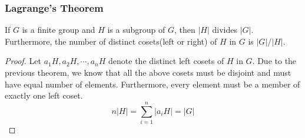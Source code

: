 \documentclass{beamer}
\begin{document}
	\begin{frame}
		\frametitle{Lagrange's Theorem}
		\begin{theorem}[Lagrange, 1770]
			If $G$ is a finite group and $H$ is a subgroup of $G$, then $|H|$ divides $|G|$. Furthermore, the number of distinct cosets(left or right) of $H$ in $G$ is $|G|/|H|$.
		\end{theorem}
		\begin{proof}
			Let $a_1H,a_2H,\cdots,a_nH$ denote the distinct left cosets of $H$ in $G$. Due to the previous theorem, we know that all the above cosets must be disjoint and must have equal number of elements. Furthermore, every element must be a member of exactly one left coset. 
			\begin{equation*}
				n|H| = \sum_{i=1}^n|a_iH| = |G|
			\end{equation*}
		\end{proof}
	\end{frame}
	
\end{document}
